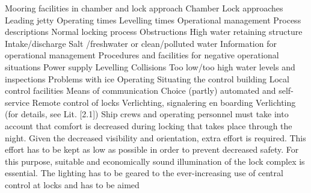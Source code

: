 \newline \indent Mooring facilities in chamber and lock approach
Chamber
Lock approaches
Leading jetty
\newline \indent Operating times
\newline \indent Levelling times
\newline \indent Operational management
Process descriptions
Normal locking process
Obstructions
High water retaining structure
Intake/discharge
Salt /freshwater or clean/polluted water
Information for operational management
Procedures and facilities for negative operational situations
Power supply
Levelling%
Collisions
Too low/too high water levels and inspections
Problems with ice
\newline \indent Operating
Situating the control building
Local control facilities
Means of communication
Choice (partly) automated and self-service
Remote control of locks
\newline \indent Verlichting, signalering en boarding
Verlichting (for details, see Lit. [2.1])
Ship crews and operating personnel must take into account that comfort is decreased during locking that
takes place through the night. Given the decreased visibility and orientation, extra effort is required. This
effort has to be kept as low as possible in order to prevent decreased safety. For this purpose, suitable
and economically sound illumination of the lock complex is essential.
The lighting has to be geared to the ever-increasing use of central control at locks and has to be aimed
